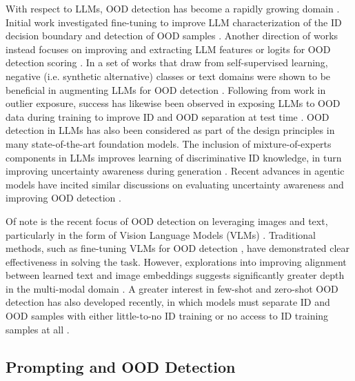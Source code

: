 With respect to LLMs, OOD detection has become a rapidly growing domain \cite{xu2025large,liu2024good,wang2024can,liu2024can,sali2025navigating,zaera2025efficient}. Initial work investigated fine-tuning to improve LLM characterization of the ID decision boundary and detection of OOD samples \cite{salimbeni2024beyond,zhang2024your,xu2022contrastive,hanparameter,kim2024investigation,wang2025chain,singh2025few,castillo2025intent}. Another direction of works instead focuses on improving and extracting LLM features or logits for OOD detection scoring \cite{lee2024ced,huang2024out,cao2024envisioning,baran2023classical,uppaal2023fine,tint2025prood}. In a set of works that draw from self-supervised learning, negative (i.e. synthetic alternative) classes or text domains were shown to be beneficial in augmenting LLMs for OOD detection \cite{huang2024out,luo2025semi}. Following from work in outlier exposure, success has likewise been observed in exposing LLMs to OOD data during training to improve ID and OOD separation at test time \cite{cao2024envisioning,park2023powerfulness,xu2023contrastive}. OOD detection in LLMs has also been considered as part of the design principles in many state-of-the-art foundation models. The inclusion of mixture-of-experts components in LLMs improves learning of discriminative ID knowledge, in turn improving uncertainty awareness during generation \cite{dai2024deepseekmoe,jiang2024mixtral}. Recent advances in agentic models have incited similar discussions on evaluating uncertainty awareness and improving OOD detection \cite{lee2025concept}. 

Of note is the recent focus of OOD detection on leveraging images and text, particularly in the form of Vision Language Models (VLMs) \cite{miyaigeneralized,lee2025harnessing,dai2023exploring,alnegheimish2025m}. Traditional methods, such as fine-tuning VLMs for OOD detection \cite{zeng2024local,xu2025overcoming}, have demonstrated clear effectiveness in solving the task. However, explorations into improving alignment between learned text and image embeddings suggests significantly greater depth in the multi-modal domain \cite{kim2025enhanced,zhang2025runa}. A greater interest in few-shot and zero-shot OOD detection has also developed recently, in which models must separate ID and OOD samples with either little-to-no ID training or no access to ID training samples at all \cite{madan2024revisiting,esmaeilpour2022zero}. 

\subsection{Prompting and OOD Detection}


